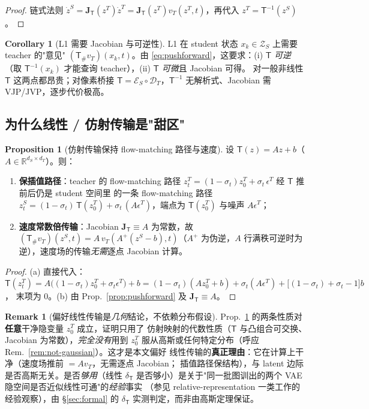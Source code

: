 \documentclass[11pt,a4paper]{article}
\newcommand{\R}{\mathbb{R}}
\newcommand{\Enc}{\mathcal{E}}
\newcommand{\Dec}{\mathcal{D}}
\newcommand{\Zs}{\mathcal{Z}_S}
\newcommand{\Tmap}{\mathsf{T}}
\newcommand{\push}{\#}
\newcommand{\vT}{v_{T}}
\newcommand{\Jac}{\mathbf{J}}
\theoremstyle{definition}
\newtheorem{remark}{Remark}
\newtheorem{proposition}{Proposition}
\newtheorem{corollary}{Corollary}
\begin{document}
\begin{proof}
链式法则 $\dot z^S=\Jac_{\Tmap}(z^T)\dot z^T=\Jac_{\Tmap}(z^T)\vT(z^T,t)$，再代入
$z^T=\Tmap^{-1}(z^S)$。
\end{proof}

\begin{corollary}[L1 需要 Jacobian 与可逆性]
\label{cor:l1-hard}
L1 在 student 状态 $x_k\in\Zs$ 上需要 teacher 的"意见"
$(\Tmap_\push\vT)(x_k,t)$。由 \eqref{eq:pushforward}，这要求：(i) $\Tmap$ \emph{可逆}
（取 $\Tmap^{-1}(x_k)$ 才能查询 teacher），(ii) $\Tmap$ \emph{可微}且 Jacobian 可得。
对一般非线性 $\Tmap$ 这两点都昂贵；对像素桥接 $\Tmap=\Enc_S\circ\Dec_T$，$\Tmap^{-1}$
无解析式、Jacobian 需 VJP/JVP，逐步代价极高。
\end{corollary}

\subsection{为什么线性 / 仿射传输是"甜区"}

\begin{proposition}[仿射传输保持 flow-matching 路径与速度]
\label{prop:affine}
设 $\Tmap(z)=Az+b$（$A\in\R^{d_S\times d_T}$）。则：
\begin{enumerate}[leftmargin=1.6em,label=(\alph*)]
\item \textbf{保插值路径}：teacher 的 flow-matching 路径
$z_t^T=(1-\sigma_t)z_0^T+\sigma_t\,\epsilon^T$ 经 $\Tmap$ 推前后仍是 student 空间里
的一条 flow-matching 路径
$z_t^S=(1-\sigma_t)\,\Tmap(z_0^T)+\sigma_t\,(A\epsilon^T)$，端点为
$\Tmap(z_0^T)$ 与噪声 $A\epsilon^T$；
\item \textbf{速度常数倍传输}：Jacobian $\Jac_{\Tmap}\equiv A$ 为常数，故
$(\Tmap_\push\vT)(z^S,t)=A\,\vT(A^{+}(z^S-b),t)$（$A^{+}$ 为伪逆，$A$ 行满秩可逆时为
逆），速度场的传输\emph{无需}逐点 Jacobian 计算。
\end{enumerate}
\end{proposition}

\begin{proof}
(a) 直接代入：$\Tmap(z_t^T)=A\big((1-\sigma_t)z_0^T+\sigma_t\epsilon^T\big)+b
=(1-\sigma_t)(Az_0^T+b)+\sigma_t(A\epsilon^T)+\big[(1-\sigma_t)+\sigma_t-1\big]b$，
末项为 $0$。(b) 由 Prop.~\ref{prop:pushforward} 及 $\Jac_{\Tmap}\equiv A$。
\end{proof}

\begin{remark}[偏好线性传输是\emph{几何}结论，不依赖分布假设]
\label{rem:affine-geometry}
Prop.~\ref{prop:affine} 的两条性质对\textbf{任意}干净隐变量 $z_0^T$ 成立，证明只用了
仿射映射的代数性质（$\Tmap$ 与凸组合可交换、Jacobian 为常数），\emph{完全没有}用到
$z_0^T$ 服从高斯或任何特定分布（呼应 Rem.~\ref{rem:not-gaussian}）。这才是本文偏好
线性传输的\textbf{真正理由}：它在计算上干净（速度场推前 $=A\vT$，无需逐点 Jacobian；
插值路径保结构），与 latent 边际是否高斯无关。是否\emph{够用}（线性 $\delta_{\Tmap}$
是否够小）是关于"同一批图训出的两个 VAE 隐空间是否近似线性可通"的\emph{经验}事实
（参见 relative-representation 一类工作的经验观察），由 \S\ref{sec:formal} 的
$\delta_{\Tmap}$ 实测判定，而非由高斯定理保证。
\end{remark}
\end{document}
